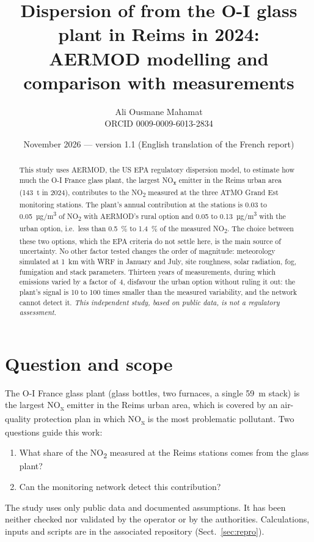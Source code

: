 \documentclass[11pt,a4paper]{article}
\title{Dispersion of \NOx{} from the O-I glass plant in Reims in 2024:\\AERMOD modelling and comparison with measurements}
\author{Ali Ousmane Mahamat\\{\small ORCID 0009-0009-6013-2834}}
\date{November 2026 — version 1.1 (English translation of the French report)}
\newcommand{\NOx}{NO\textsubscript{x}}
\newcommand{\NOd}{NO\textsubscript{2}}
\newcommand{\ugm}{µg/m\textsuperscript{3}}
\begin{document}
\maketitle

\begin{abstract}
\noindent This study uses AERMOD, the US EPA regulatory dispersion model, to estimate how much the O-I France glass
plant, the largest \NOx{} emitter in the Reims urban area (143~t in 2024), contributes to the \NOd{} measured at the
three ATMO Grand Est monitoring stations. The plant's annual contribution at the stations is 0.03 to 0.05~\ugm{}
of \NOd{} with AERMOD's rural option and 0.05 to 0.13~\ugm{} with the urban option, i.e.\ less than 0.5~\% to
1.4~\% of the measured \NOd. The choice between these two options, which the EPA criteria do not settle here, is the
main source of uncertainty. No other factor tested changes the order of magnitude: meteorology simulated at 1~km
with WRF in January and July, site roughness, solar radiation, fog, fumigation and stack parameters. Thirteen years
of measurements, during which emissions varied by a factor of~4, disfavour the urban option without ruling it out:
the plant's signal is 10 to 100 times smaller than the measured variability, and the network cannot detect it.
\textit{This independent study, based on public data, is not a regulatory assessment.}
\end{abstract}

\section{Question and scope}
The O-I France glass plant (glass bottles, two furnaces, a single 59~m stack) is the largest \NOx{} emitter in the
Reims urban area, which is covered by an air-quality protection plan in which \NOx{} is the most problematic
pollutant. Two questions guide this work:
\begin{enumerate}
\item What share of the \NOd{} measured at the Reims stations comes from the glass plant?
\item Can the monitoring network detect this contribution?
\end{enumerate}
The study uses only public data and documented assumptions. It has been neither checked nor validated by the
operator or by the authorities. Calculations, inputs and scripts are in the associated repository
(Sect.~\ref{sec:repro}).
\end{document}
